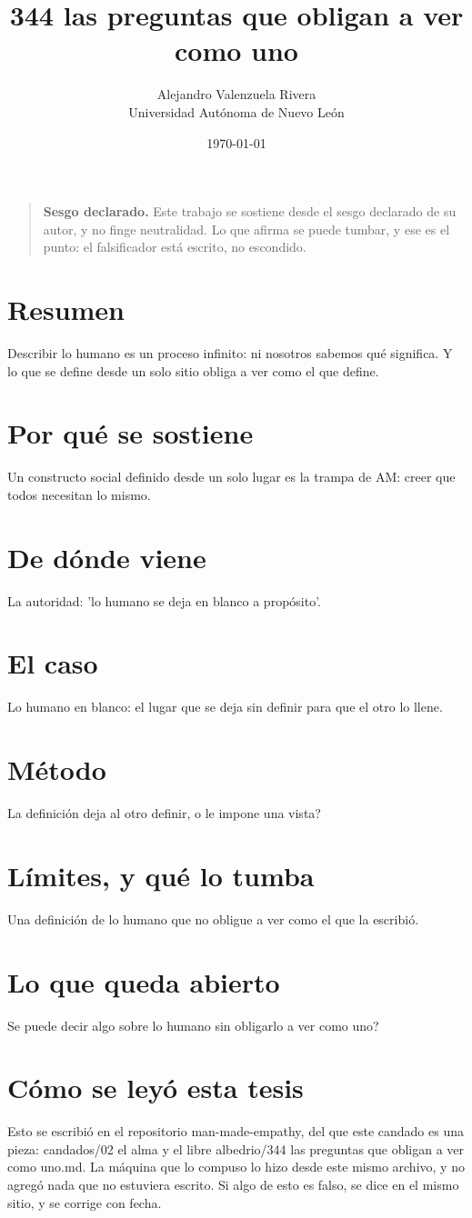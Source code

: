 \documentclass[11pt,a4paper]{article}
\title{344 las preguntas que obligan a ver como uno}
\author{Alejandro Valenzuela Rivera\\\small Universidad Autónoma de Nuevo León}
\date{\today}
\begin{document}
\maketitle

\begin{quote}
\textbf{Sesgo declarado.} Este trabajo se sostiene desde el sesgo declarado de su autor, y no finge neutralidad. Lo que afirma se puede tumbar, y ese es el punto: el falsificador está escrito, no escondido.
\end{quote}

\section*{Resumen}
Describir lo humano es un proceso infinito: ni nosotros sabemos qué significa. Y lo que se define desde un solo sitio obliga a ver como el que define.

\section{Por qué se sostiene}
Un constructo social definido desde un solo lugar es la trampa de AM: creer que todos necesitan lo mismo.

\section{De dónde viene}
La autoridad: 'lo humano se deja en blanco a propósito'.

\section{El caso}
Lo humano en blanco: el lugar que se deja sin definir para que el otro lo llene.

\section{Método}
\textquestiondown{}La definición deja al otro definir, o le impone una vista?

\section{Límites, y qué lo tumba}
Una definición de lo humano que no obligue a ver como el que la escribió.

\section{Lo que queda abierto}
\textquestiondown{}Se puede decir algo sobre lo humano sin obligarlo a ver como uno?

\section*{Cómo se leyó esta tesis}
Esto se escribió en el repositorio man-made-empathy, del que este candado es una pieza: candados/02 el alma y el libre albedrio/344 las preguntas que obligan a ver como uno.md. La máquina que lo compuso lo hizo desde este mismo archivo, y no agregó nada que no estuviera escrito. Si algo de esto es falso, se dice en el mismo sitio, y se corrige con fecha.
\end{document}
